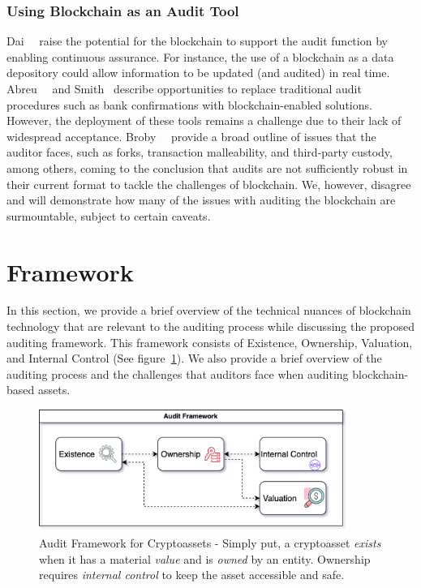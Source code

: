\subsubsection{Using Blockchain as an Audit Tool}
Dai~\etal~\cite{dai2017toward} raise the potential for the blockchain to support the audit function by enabling continuous assurance. For instance, the use of a blockchain as a data depository could allow information to be updated (and audited) in real time. Abreu~\etal~\cite{abreu2018blockchain} and Smith~\cite{cgma2018blockchain} describe opportunities to replace traditional audit procedures such as bank confirmations with blockchain-enabled solutions. However, the deployment of these tools remains a challenge due to their lack of widespread acceptance. Broby~\etal~\cite{broby2017financial} provide a broad outline of issues that the auditor faces, such as forks, transaction malleability, and third-party custody, among others, coming to the conclusion that audits are not sufficiently robust in their current format to tackle the challenges of blockchain. We, however, disagree and will demonstrate how many of the issues with auditing the blockchain are surmountable, subject to certain caveats.

\section{Framework} \label{sec:auditing:framework} 
In this section, we provide a brief overview of the technical nuances of blockchain technology that are relevant to the auditing process while discussing the proposed auditing framework. This framework consists of Existence, Ownership, Valuation, and Internal Control (See figure~\ref{fig:audit_framework}). We also provide a brief overview of the auditing process and the challenges that auditors face when auditing blockchain-based assets.


\begin{figure}[t]\label{fig:audit_framework}
    \centering
    \includegraphics[width=0.9\textwidth]{figures/audit_framework.png}
    \caption[Audit Framework for Cryptoassets]{Audit Framework for Cryptoassets - Simply put, a cryptoasset \textit{exists} when it has a material \textit{value} and is \textit{owned} by an entity. Ownership requires \textit{internal control} to keep the asset accessible and safe.}
\end{figure}	

